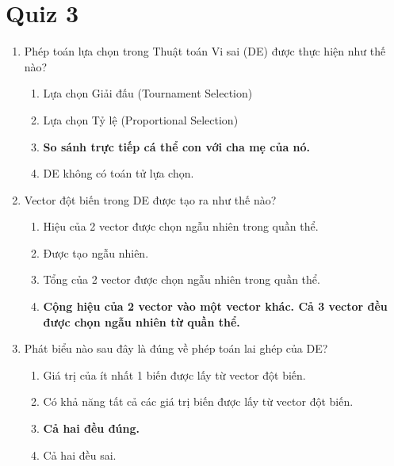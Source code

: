 \documentclass{book}
\begin{document}
\section{Quiz 3}
\begin{enumerate}
    \item Phép toán lựa chọn trong Thuật toán Vi sai (DE) được thực hiện như thế nào?
    \begin{multicols}{2}
        \begin{enumerate}[label=\Alph*]
            \item Lựa chọn Giải đấu (Tournament Selection)
            \item Lựa chọn Tỷ lệ (Proportional Selection)
            \item \textbf{So sánh trực tiếp cá thể con với cha mẹ của nó.}
            \item DE không có toán tử lựa chọn.
        \end{enumerate}
    \end{multicols}

    \item Vector đột biến trong DE được tạo ra như thế nào?
    \begin{multicols}{2}
        \begin{enumerate}[label=\Alph*]
            \item Hiệu của 2 vector được chọn ngẫu nhiên trong quần thể.
            \item Được tạo ngẫu nhiên.
            \item Tổng của 2 vector được chọn ngẫu nhiên trong quần thể.
            \item \textbf{Cộng hiệu của 2 vector vào một vector khác. Cả 3 vector đều được chọn ngẫu nhiên từ quần thể.}
        \end{enumerate}
    \end{multicols}

    \item Phát biểu nào sau đây là đúng về phép toán lai ghép của DE?
    \begin{multicols}{2}
        \begin{enumerate}[label=\Alph*]
            \item Giá trị của ít nhất 1 biến được lấy từ vector đột biến.
            \item Có khả năng tất cả các giá trị biến được lấy từ vector đột biến.
            \item \textbf{Cả hai đều đúng.}
            \item Cả hai đều sai.
        \end{enumerate}
    \end{multicols}


\end{enumerate}
\end{document}
